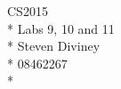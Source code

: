 \documentclass[a4paper,12pt]{article}
\begin{document}
\pagestyle{empty}
\begin{center}
{\large CS2015} \\*
Labs 9, 10 and 11\\*
Steven Diviney \\*
08462267\\*
\end{center}
\end{document}
